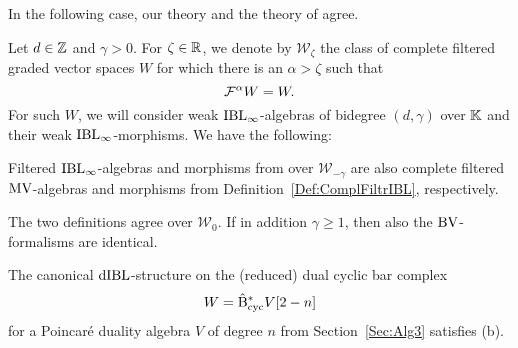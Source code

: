 \documentclass[\MainFolder/Text.tex]{subfiles}
\begin{document}
In the following case, our theory and the theory of \cite{Cieliebak2015} agree.

\begin{Proposition}\label{Prop:BVforIBL}
Let $d\in \mathbb{Z}$ and $\gamma>0$. For $\zeta\in \mathbb{R}$, we denote by $\mathcal{W}_\zeta$ the class of complete filtered graded vector spaces $W$ for which there is an $\alpha>\zeta$ such that
\begin{equation}\label{Eq:FiltrCondU}
 \mathcal{F}^{\alpha} W = W.
\end{equation}
For such $W$, we will consider weak $\mathrm{IBL}_\infty$-algebras of bidegree $(d,\gamma)$ over $\mathbb{K}$ and their weak $\mathrm{IBL}_\infty$-morphisms. We have the following:
\begin{ClaimList}
\item Filtered $\mathrm{IBL}_\infty$-algebras and morphisms from \cite{Cieliebak2015} over $\mathcal{W}_{-\gamma}$ are also complete filtered $\mathrm{MV}$-algebras and morphisms from Definition~\ref{Def:ComplFiltrIBL}, respectively.
\item The two definitions agree over $\mathcal{W}_0$. If in addition $\gamma\ge 1$, then also the $\mathrm{BV}$-formalisms are identical.
\item The canonical $\mathrm{dIBL}$-structure on the (reduced) dual cyclic bar complex 
\[W = \hat{\mathrm{B}}_{\mathrm{cyc}}^* V[2-n]\]
for a Poincar\'e duality algebra $V$ of degree $n$ from Section~\ref{Sec:Alg3} satisfies (b).
\end{ClaimList}
%
\end{Proposition}
\end{document}
